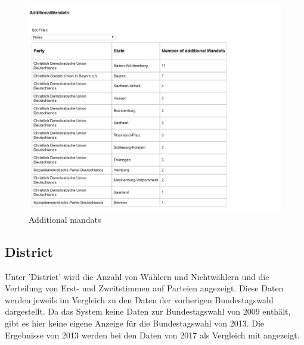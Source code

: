 \documentclass[a4paper]{scrreprt}
\begin{document}
\begin{figure}[H]
\centering
\includegraphics[width=\textwidth]{images/additional_mandats.png}
\caption {Additional mandats}
\end{figure}

\subsection{District}

Unter 'District' wird die Anzahl von Wählern und Nichtwählern und die Verteilung von Erst- und Zweitstimmen auf Parteien angezeigt. Diese Daten werden jeweils im Vergleich zu den Daten der vorherigen Bundestagswahl dargestellt. Da das System keine Daten zur Bundestagswahl von 2009 enthält, gibt es hier keine eigene Anzeige für die Bundestagswahl von 2013. Die Ergebnisse von 2013 werden bei den Daten von 2017 als Vergleich mit angezeigt.
\end{document}
